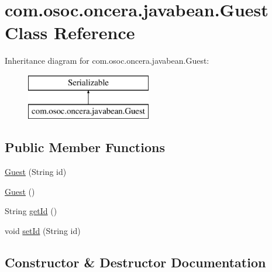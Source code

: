 \hypertarget{classcom_1_1osoc_1_1oncera_1_1javabean_1_1_guest}{}\section{com.\+osoc.\+oncera.\+javabean.\+Guest Class Reference}
\label{classcom_1_1osoc_1_1oncera_1_1javabean_1_1_guest}
Inheritance diagram for com.\+osoc.\+oncera.\+javabean.\+Guest\+:\begin{figure}[H]
\begin{center}
\leavevmode
\includegraphics[height=2.000000cm]{classcom_1_1osoc_1_1oncera_1_1javabean_1_1_guest}
\end{center}
\end{figure}
\subsection*{Public Member Functions}
\begin{DoxyCompactItemize}
\item 
\mbox{\hyperlink{classcom_1_1osoc_1_1oncera_1_1javabean_1_1_guest_abc5d549de64e7ecf104a237ba7d14b53}{Guest}} (String id)
\item 
\mbox{\hyperlink{classcom_1_1osoc_1_1oncera_1_1javabean_1_1_guest_a46dc74884e55ea1ad8660b43bb1ab779}{Guest}} ()
\item 
String \mbox{\hyperlink{classcom_1_1osoc_1_1oncera_1_1javabean_1_1_guest_aa8c41bb41f5f2910fe7abf7364263932}{get\+Id}} ()
\item 
void \mbox{\hyperlink{classcom_1_1osoc_1_1oncera_1_1javabean_1_1_guest_a47472d089db3bc881a438b7ba2756f82}{set\+Id}} (String id)
\end{DoxyCompactItemize}


\subsection{Constructor \& Destructor Documentation}
\mbox{\label{classcom_1_1osoc_1_1oncera_1_1javabean_1_1_guest_abc5d549de64e7ecf104a237ba7d14b53}} 
